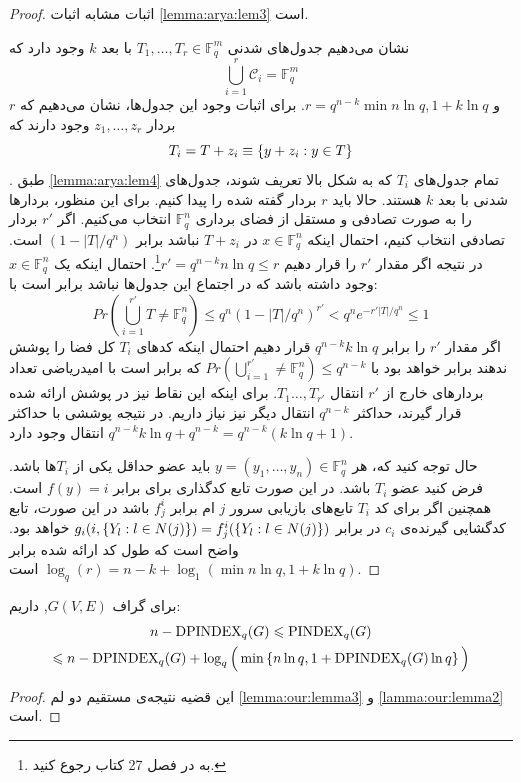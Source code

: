 \begin{proof}
	اثبات مشابه اثبات
	\autoref{lemma:arya:lem3}
	است.
	
	نشان می‌دهیم جدول‌های شدنی
	$T_1, \ldots, T_r \in \mathbb{F}_q^m$
	با بعد
	$k$
	وجود دارد که
	\begin{equation}
		\bigcup_{i = 1}^r \mathcal{C}_i = \mathbb{F}_q^m
	\end{equation}
	و 
	$r = q^{n - k} \min{n \ln q, 1 + k \ln q}$.
	برای اثبات وجود این جدول‌ها، نشان می‌دهیم که
	$r$
	بردار
	$z_1, \dots, z_r$
	وجود دارند که
	\begin{equation}
		T_i = T + z_i \equiv \left\{ y + z_i: y \in T \right\}
	\end{equation}.
	طبق
	\autoref{lemma:arya:lem4}
	تمام جدول‌های
	$T_i$
	که به شکل بالا تعریف شوند، جدول‌های شدنی	با بعد
	$k$
	هستند.	 حالا باید $r$ بردار گفته شده را پیدا کنیم. برای این منظور، بردارها را به صورت تصادفی و مستقل از فضای برداری
	$\mathbb{F}_q^n$
	انتخاب می‌کنیم. اگر
	$r'$
	بردار تصادفی انتخاب کنیم، احتمال اینکه 
	$x \in \mathbb{F}_q^n$
	در
	$T + z_i$
	نباشد برابر
	$ (1 - |T|/q^n)$
	است. در نتیجه اگر مقدار
	$r'$
	را قرار دهیم
	$r' = q^{n - k} n \ln q \leq r$\footnote{
		به
		در فصل 27 کتاب
		\cite{graham1995handbook}
		رجوع کنید.
	}.
	 احتمال اینکه یک 
	$x \in \mathbb{F}_q^n$
	وجود داشته باشد که در اجتماع این جدول‌ها نباشد برابر است با:
	\begin{equation}
	Pr(\bigcup_{i = 1}^{r'} T \ne \mathbb{F}_q^n) \leq q^n (1 - |T|/q^n)^{r'} < q^n e^{- r' |T| / q^n} \leq 1
	\end{equation}
	اگر مقدار
	$r'$
	را برابر
	$q^{n - k} k \ln q$
	قرار دهیم احتمال اینکه کدهای
	$T_i$
	کل فضا را پوشش ندهند برابر خواهد بود با
	$Pr(\bigcup_{i = 1}^{r'} \ne \mathbb{F}_q^n) \leq q^{n - k}$
	که برابر است با امیدریاضی تعداد بردارهای خارج از 
	$r'$
	انتقال
	$T_1\ldots, T_{r'}$.
	برای اینکه این نقاط نیز در پوشش ارائه شده قرار گیرند، حداکثر 
	$q^{n - k}$
	انتقال دیگر نیز نیاز داریم. در نتیجه پوششی با حداکثر
	$q^{n - k} k \ln q + q^{n - k} = q^{n - k}(k \ln q + 1)$
	انتقال وجود دارد.
	 	 
	حال توجه کنید که، هر
	$y = (y_1, \dots, y_n) \in \mathbb{F}_q^n$
	باید عضو حداقل یکی از
	$T_i$ها
	باشد. فرض کنید عضو
	$T_i$
	باشد. در این صورت تابع کدگذاری برای
	\icod
	برابر
	$f(y) = i$
	است. همچنین اگر برای کد
	$T_i$
	تابع‌های بازیابی سرور
	$j$
	ام برابر
	$f_j^i$
	باشد در این صورت، تابع کدگشایی گیرنده‌ی
	$c_i$
	در
	\icod
	برابر
	$g_i(i, \left\{ Y_l: l \in N(j) \right\}) = f_j^i(\left\{ Y_l: l \in N(j) \right\})$
	خواهد بود.
	واضح است که طول کد 
	\icod
	ارائه شده برابر
	$\log_q(r) = n - k + \log_1(\min{n \ln q, 1 + k \ln q})$
	است.
\end{proof}
\begin{theorem}
	\label{thm:ourmain}
	برای گراف
	$G(V,E)$,
	داریم:
	\begin{multline}
		n - \mathrm{DPINDEX}_q(G) \leqslant \mathrm{PINDEX}_q(G) \\ \leqslant n -\mathrm{DPINDEX}_q(G) + \log_q\Big(\min\left\{ n\ln q, 1+ \mathrm{DPINDEX}_q(G)\ln q  \right\}\Big)
	\end{multline}
\end{theorem}
\begin{proof}
	این قضیه نتیجه‌ی مستقیم دو لم
	\autoref{lemma:our:lemma3}
	و
	\autoref{lamma:our:lemma2}
	است.
\end{proof}


